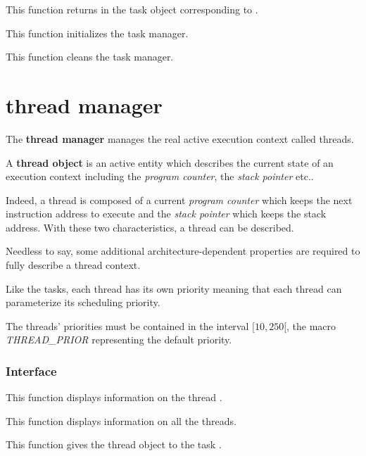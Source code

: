 	 {
	   This function returns in  the task object corresponding
	   to .
	 }

	 {
	   This function initializes the task manager.
	 }

	 {
	   This function cleans the task manager.
	 }

%
%

\section{thread manager}

The \textbf{thread manager} manages the real active execution context
called threads.

A \textbf{thread object} is an active entity which describes the
current state of an execution context including the \textit{program counter},
the \textit{stack pointer} etc..

Indeed, a thread is composed of a current \textit{program counter} which
keeps the next instruction address to execute and the \textit{stack pointer}
which keeps the stack address. With these two characteristics, a thread
can be described.

Needless to say, some additional architecture-dependent properties are
required to fully describe a thread context.

Like the tasks, each thread has its own priority meaning that each thread
can parameterize its scheduling priority.

The threads' priorities must be contained in the interval $[10, 250[$, the
macro \textit{THREAD\_PRIOR} representing the default priority.

%
%

\subsubsection{Interface}

	 {
	   This function displays information on the thread .
	 }

	 {
	   This function displays information on all the threads.
	 }

	 {
	   This function gives the thread object  to the
	   task .
	 }

